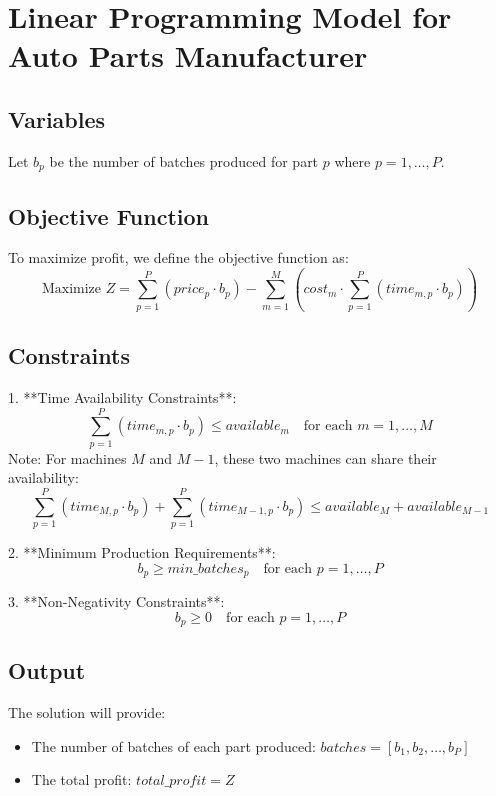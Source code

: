 \documentclass{article}
\begin{document}
\section*{Linear Programming Model for Auto Parts Manufacturer}

\subsection*{Variables}
Let \( b_p \) be the number of batches produced for part \( p \) where \( p = 1, \ldots, P \).

\subsection*{Objective Function}
To maximize profit, we define the objective function as:
\[
\text{Maximize } Z = \sum_{p=1}^{P} (price_p \cdot b_p) - \sum_{m=1}^{M} (cost_m \cdot \sum_{p=1}^{P} (time_{m,p} \cdot b_p))
\]

\subsection*{Constraints}
1. **Time Availability Constraints**:
   \[
   \sum_{p=1}^{P} (time_{m,p} \cdot b_p) \leq available_m \quad \text{for each } m = 1, \ldots, M
   \]
   Note: For machines \( M \) and \( M-1 \), these two machines can share their availability:
   \[
   \sum_{p=1}^{P} (time_{M,p} \cdot b_p) + \sum_{p=1}^{P} (time_{M-1,p} \cdot b_p) \leq available_M + available_{M-1}
   \]

2. **Minimum Production Requirements**:
   \[
   b_p \geq min\_batches_p \quad \text{for each } p = 1, \ldots, P
   \]

3. **Non-Negativity Constraints**:
   \[
   b_p \geq 0 \quad \text{for each } p = 1, \ldots, P
   \]

\subsection*{Output}
The solution will provide:
\begin{itemize}
    \item The number of batches of each part produced: \( batches = [b_1, b_2, \ldots, b_P] \)
    \item The total profit: \( total\_profit = Z \)
\end{itemize}
\end{document}
